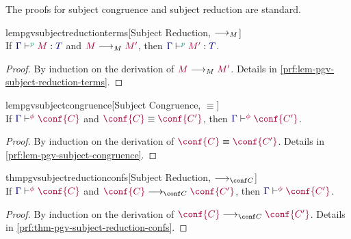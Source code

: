 \documentclass[main.tex]{subfiles}
\begin{document}
The proofs for subject congruence and subject reduction are standard.
\begin{restatablelemma}{lempgvsubjectreductionterms}[Subject Reduction, $\longrightarrow_{M}$]
  \label{lem:pgv-subject-reduction-terms}
  \hfill\\%
  If $\tseq[\cs{p}]{\ty{\Gamma}}{M}{T}$ and $\tm{M}\tred\tm{M'}$,
  then $\tseq[\cs{p}]{\ty{\Gamma}}{M'}{T}$.
\end{restatablelemma}
\begin{proof}
  By induction on the derivation of $\tm{M}\tred\tm{M'}$.
  Details in \cref{prf:lem-pgv-subject-reduction-terms}.
\end{proof}
\begin{restatablelemma}{lempgvsubjectcongruence}[Subject Congruence, $\equiv$]
  \label{lem:pgv-subject-congruence}
  \hfill\\%
  If $\cseq[\phi]{\ty{\Gamma}}{\conf{C}}$ and $\tm{\conf{C}}\equiv\tm{\conf{C'}}$,
  then $\cseq[\phi]{\ty{\Gamma}}{\conf{C'}}$.
\end{restatablelemma}
\begin{proof}
  By induction on the derivation of $\tm{\conf{C}}\equiv\tm{\conf{C'}}$.
  Details in \cref{prf:lem-pgv-subject-congruence}.
\end{proof}
\begin{restatabletheorem}{thmpgvsubjectreductionconfs}[Subject Reduction, $\cred$]
  \label{thm:pgv-subject-reduction-confs}
  \hfill\\%
  If $\cseq[\phi]{\ty{\Gamma}}{\conf{C}}$ and $\tm{\conf{C}}\cred\tm{\conf{C'}}$,
  then $\cseq[\phi]{\ty{\Gamma}}{\conf{C'}}$.
\end{restatabletheorem}
\begin{proof}
  By induction on the derivation of $\tm{\conf{C}}\cred\tm{\conf{C'}}$.
  Details in \cref{prf:thm-pgv-subject-reduction-confs}.
\end{proof}
\end{document}
